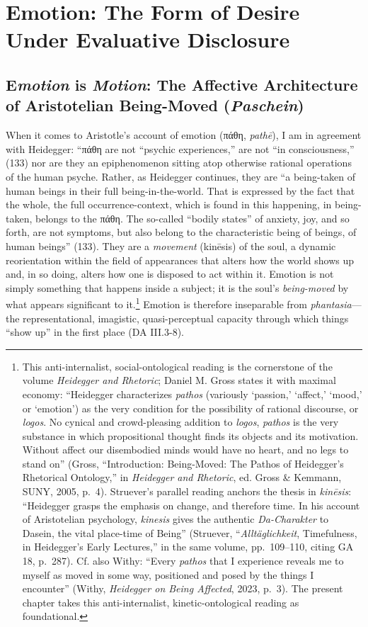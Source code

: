 \documentclass{article}
\newcommand{\gk}[1]{{\greekfont #1}}
\begin{document}
\section{Emotion: The Form of Desire Under Evaluative Disclosure}


\subsection{E\textit{motion} is \textit{Motion}: The Affective Architecture of Aristotelian Being-Moved (\textit{Paschein})}

When it comes to Aristotle’s account of emotion (\gk{πάθη}, \textit{pathē}), I am in agreement with Heidegger: ``\gk{πάθη} are not ``psychic experiences,'' are not ``in consciousness,'' (133) nor are they an epiphenomenon sitting atop otherwise rational operations of the human psyche. Rather, as Heidegger continues, they are ``a being-taken of human beings in their full being-in-the-world. That is expressed by the fact that the whole, the full occurrence-context, which is found in this happening, in being-taken, belongs to the \gk{πάθη}. The so-called ``bodily states'' of anxiety, joy, and so forth, are not symptoms, but also belong to the characteristic being of beings, of human beings'' (133). They are a \textit{movement} (kinēsis) of the soul, a dynamic reorientation within the field of appearances that alters how the world shows up and, in so doing, alters how one is disposed to act within it. Emotion is not simply something that happens inside a subject; it is the soul’s \textit{being-moved} by what appears significant to it.\footnote{This anti-internalist, social-ontological reading is the cornerstone of the volume \textit{Heidegger and Rhetoric}; Daniel M. Gross states it with maximal economy: ``Heidegger characterizes \textit{pathos} (variously `passion,' `affect,' `mood,' or `emotion') as the very condition for the possibility of rational discourse, or \textit{logos}. No cynical and crowd-pleasing addition to \textit{logos}, \textit{pathos} is the very substance in which propositional thought finds its objects and its motivation. Without affect our disembodied minds would have no heart, and no legs to stand on'' (Gross, ``Introduction: Being-Moved: The Pathos of Heidegger's Rhetorical Ontology,'' in \textit{Heidegger and Rhetoric}, ed. Gross \& Kemmann, SUNY, 2005, p.~4). Struever's parallel reading anchors the thesis in \textit{kinēsis}: ``Heidegger grasps the emphasis on change, and therefore time. In his account of Aristotelian psychology, \textit{kinesis} gives the authentic \textit{Da-Charakter} to Dasein, the vital place-time of Being'' (Struever, ``\textit{Alltäglichkeit}, Timefulness, in Heidegger's Early Lectures,'' in the same volume, pp.~109--110, citing GA 18, p.~287). Cf. also Withy: ``Every \textit{pathos} that I experience reveals me to myself as moved in some way, positioned and posed by the things I encounter'' (Withy, \textit{Heidegger on Being Affected}, 2023, p.~3). The present chapter takes this anti-internalist, kinetic-ontological reading as foundational.} Emotion is therefore inseparable from \textit{phantasia}—the representational, imagistic, quasi-perceptual capacity through which things “show up” in the first place (DA III.3-8). 
\end{document}
